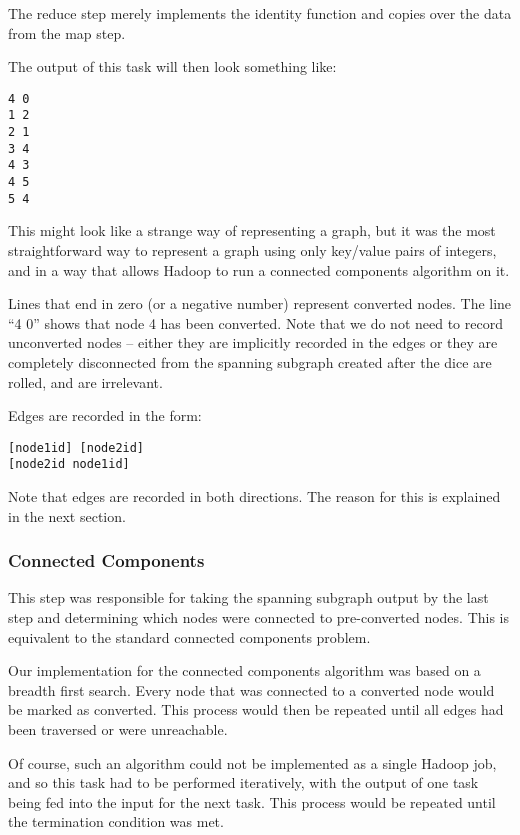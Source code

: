 The reduce step merely implements the identity function and copies over the data from the map step.

The output of this task will then look something like:

\begin{verbatim}
4 0
1 2
2 1
3 4
4 3
4 5
5 4
\end{verbatim}

This might look like a strange way of representing a graph, but it was the most straightforward way to represent a graph using only key/value pairs of integers, and in a way that allows Hadoop to run a connected components algorithm on it.

Lines that end in zero (or a negative number) represent converted nodes. The line ``4 0'' shows that node 4 has been converted. Note that we do not need to record unconverted nodes -- either they are implicitly recorded in the edges or they are completely disconnected from the spanning subgraph created after the dice are rolled, and are irrelevant.

Edges are recorded in the form:

\begin{verbatim}
[node1id] [node2id]
[node2id node1id]
\end{verbatim}

Note that edges are recorded in both directions. The reason for this is explained in the next section.

\subsubsection{Connected Components}

This step was responsible for taking the spanning subgraph output by the last step and determining which nodes were connected to pre-converted nodes. This is equivalent to the standard connected components problem.

Our implementation for the connected components algorithm was based on a breadth first search. Every node that was connected to a converted node would be marked as converted. This process would then be repeated until all edges had been traversed or were unreachable.

Of course, such an algorithm could not be implemented as a single Hadoop job, and so this task had to be performed iteratively, with the output of one task being fed into the input for the next task. This process would be repeated until the termination condition was met.

